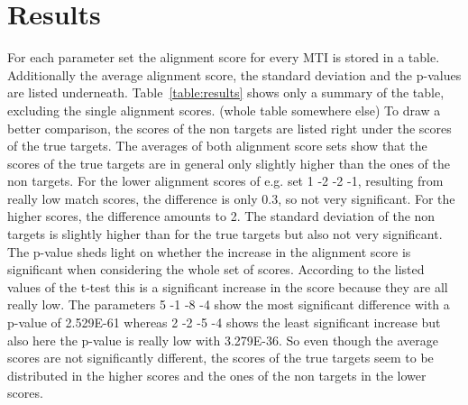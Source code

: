 \documentclass[12pt]{article}
\begin{document}
\section{Results}
For each parameter set the alignment score for every MTI is stored in a table. Additionally the average alignment score, the standard deviation and the p-values are listed underneath. Table~\ref{table:results} shows only a summary of the table, excluding the single alignment scores. (whole table somewhere else) To draw a better comparison, the scores of the non targets are listed right under the scores of the true targets. The averages of both alignment score sets show that the scores of the true targets are in general only slightly higher than the ones of the non targets. For the lower alignment scores of e.g. set 1 -2 -2 -1, resulting from really low match scores, the difference is only 0.3, so not very significant. For the higher scores, the difference amounts to 2. The standard deviation of the non targets is slightly higher than for the true targets but also not very significant. The p-value sheds light on whether the increase in the alignment score is significant when considering the whole set of scores. According to the listed values of the t-test this is a significant increase in the score because they are all really low. The parameters 5 -1 -8 -4 show the most significant difference with a p-value of 2.529E-61 whereas 2 -2 -5 -4 shows the least significant increase but also here the p-value is really low with 3.279E-36. So even though the average scores are not significantly different, the scores of the true targets seem to be distributed in the higher scores and the ones of the non targets in the lower scores.
\end{document}
